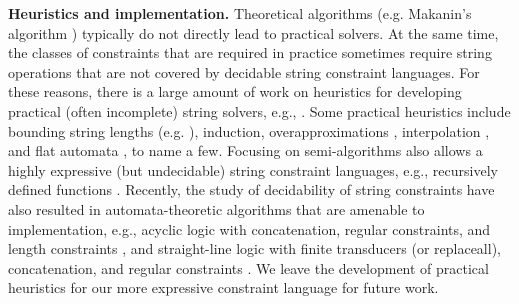 



\smallskip
\noindent
\textbf{Heuristics and implementation.}
Theoretical algorithms
(e.g. Makanin's algorithm \cite{Makanin}) typically do not directly lead to 
practical solvers. At the same time, the classes of constraints that are 
required in practice sometimes require string operations that are not covered by
decidable string constraint languages.
For these reasons,
there is a large amount of work on heuristics for developing practical
(often incomplete) string solvers, e.g., 
\cite{BTV09,Berkeley-JavaScript,HAMPI,Stranger,YABI14,Abdulla14,fang-yu-circuits,Abdulla17,HJLRV18,S3,TCJ16,Z3-str,Z3-str2,cvc4,Saner,RVG12}.
Some practical heuristics include
bounding string lengths (e.g. \cite{HAMPI,Berkeley-JavaScript,BTV09}), 
induction, overapproximations \cite{Stranger,YABI14}, interpolation
\cite{Abdulla14}, and flat automata \cite{Abdulla17}, to name a few. 
Focusing on semi-algorithms also allows a highly expressive (but undecidable) 
string 
constraint languages, e.g., recursively defined functions \cite{S3,TCJ16}. 
Recently, the study of decidability of string constraints have also resulted in
automata-theoretic algorithms that are amenable to implementation, e.g.,
acyclic logic with concatenation, regular constraints, and length constraints 
\cite{Abdulla14}, and straight-line logic with finite transducers (or
replaceall), concatenation, and regular constraints 
\cite{HJLRV18,fang-yu-circuits,yan-tool}. 
We leave the development of practical heuristics for our more expressive 
constraint language for future work.

